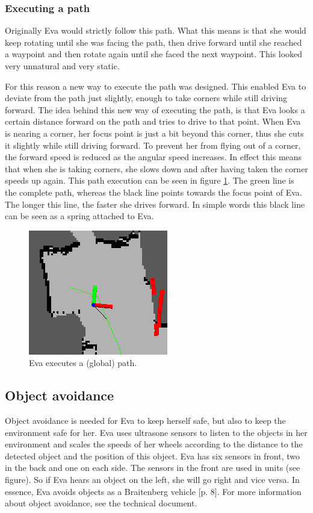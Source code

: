 \documentclass[project_eva.tex]{subfiles}
\begin{document}
\subsubsection*{Executing a path}
Originally Eva would strictly follow this path. What this means is that she would keep rotating until she was facing the path, then drive forward until she reached a waypoint and then rotate again until she faced the next waypoint. This looked very unnatural and very static. 

For this reason a new way to execute the path was designed. This enabled Eva to deviate from the path just slightly, enough to take corners while still driving forward. The idea behind this new way of executing the path, is that Eva looks a certain distance forward on the path and tries to drive to that point. When Eva is nearing a corner, her focus point is just a bit beyond this corner, thus she cuts it slightly while still driving forward. To prevent her from flying out of a corner, the forward speed is reduced as the angular speed increases. In effect this means that when she is taking corners, she slows down and after having taken the corner speeds up again. This path execution can be seen in figure \ref{fig:global_path}. The green line is the complete path, whereas the black line points towards the focus point of Eva. The longer this line, the faster she drives forward. In simple words this black line can be seen as a spring attached to Eva.
\begin{figure}[ht!]
	\centering
	\mbox{\includegraphics[scale=0.4]{Images/global_path.png}}
	\caption{Eva executes a (global) path.}
	\label{fig:global_path}
\end{figure}

\subsection*{Object avoidance}
Object avoidance is needed for Eva to keep herself safe, but also to keep the environment safe for her. Eva uses ultrasone 
sensors to listen to the objects in her environment and scales the speeds of her wheels according to the distance to the 
detected object and the position of this object. Eva has six sensors in front, two in the back and one on each side. The sensors in the front are used in units (see figure). So if Eva hears an object on the left, she will go right and vice versa. In essence, Eva avoids objects as a Braitenberg vehicle 
\cite{braitenberg} [p. 8]. For more information about object avoidance, see the 
technical document.
\end{document}
